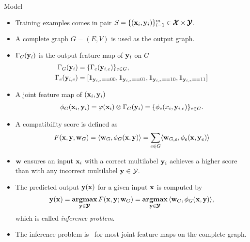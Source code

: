 \documentclass[first=dgreen,second=purple,logo=yellowexc]{aaltoslides}
\begin{document}
%
\begin{frame}[allowframebreaks]{Model}
	\begin{itemize}
		\item Training examples comes in pair $S=\{(\mathbf {x}_i,\mathbf {y}_i)\}_{i=1}^{m}\in\pmb {\mathcal{X}}\times\pmb {\mathcal{Y}}$.
		\item A complete graph $G=(E,V)$ is used as the output graph.
		\item $\Gamma_G(\mathbf {y}_i)$ is the output feature map of $\mathbf {y}_i$ on $G$
		\begin{align*}
			\Gamma_G(\mathbf {y}_i) &= \{\Gamma_e(\mathbf {y}_{i,e})\}_{e\in G},\\
			 \Gamma_e(\mathbf {y}_{i,e}) &= [\mathbf {1}_{\mathbf {y}_{i,e}==00},\mathbf {1}_{\mathbf {y}_{i,e}==01},\mathbf {1}_{\mathbf {y}_{i,e}==10},\mathbf {1}_{\mathbf {y}_{i,e}==11}]
		\end{align*}
		\item A joint feature map of $(\mathbf {x}_i,\mathbf {y}_i)$
		\begin{align*}
			\phi_G(\mathbf {x}_i,\mathbf {y}_i) = \varphi(\mathbf {x}_i)\otimes\Gamma_G(\mathbf {y}_i) = \{\phi_e(x_i,\mathbf {y}_{i,e})\}_{e\in G}.
		\end{align*}
		\item A compatibility score is defined as
		\begin{align*}
			F(\mathbf {x},\mathbf {y};\mathbf {w}_G) = \langle \mathbf {w}_G, \phi_G(\mathbf {x},\mathbf {y}) \rangle=\sum_{e\in G}\langle \mathbf {w}_{G,e}, \phi_e(\mathbf {x},\mathbf {y}_{e}) \rangle
		\end{align*} 
		\item $\mathbf {w}$ ensures an input $\mathbf {x}_i$ with a correct multilabel $\mathbf {y}_i$ achieves a higher score than with any incorrect multilabel $\mathbf {y}\in\mathcal{Y}$.
		\item The predicted output $\mathbf {y}(\mathbf {x})$ for a given input $\mathbf {x}$ is computed by
		\begin{align*}
			\mathbf {y}(\mathbf {x}) = \underset{\mathbf {y}\in\pmb {\mathcal{Y}}}{\textbf{argmax}}\,F(\mathbf {x},\mathbf {y};\mathbf {w}_G) = \underset{\mathbf {y}\in\pmb {\mathcal{Y}}}{\textbf{argmax}}\,\langle \mathbf {w}_G, \phi_G(\mathbf {x},\mathbf {y}) \rangle,
		\end{align*}
		which is called \textit{inference problem}.
		\item The {inference problem} is \nphard\ for most joint feature maps on the complete graph.
	\end{itemize}
\end{frame}
\end{document}

